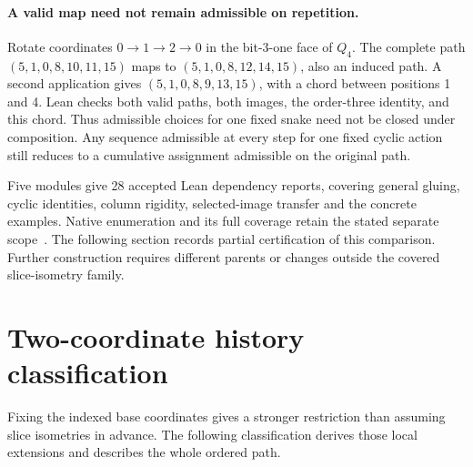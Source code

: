 \documentclass[11pt,a4paper]{article}
\theoremstyle{definition}
\theoremstyle{remark}
\begin{document}
\paragraph{A valid map need not remain admissible on repetition.}
Rotate coordinates $0\to1\to2\to0$ in the bit-3-one face of $Q_4$.
The complete path $(5,1,0,8,10,11,15)$ maps to
$(5,1,0,8,12,14,15)$, also an induced path. A second application gives
$(5,1,0,8,9,13,15)$, with a chord between positions 1 and 4.
Lean checks both valid paths, both images, the order-three identity,
and this chord. Thus admissible choices for one fixed snake need
not be closed under composition. Any sequence admissible at every
step for one fixed cyclic action still reduces to a cumulative
assignment admissible on the original path.

Five modules give 28 accepted Lean dependency reports, covering
general gluing, cyclic identities, column rigidity, selected-image
transfer and the concrete examples. Native enumeration and its full
coverage retain the stated separate scope~\cite{research204}.
The following section records partial certification of this comparison.
Further construction requires different parents or changes outside
the covered slice-isometry family.

\section{Two-coordinate history classification}
\label{sec:history205}

Fixing the indexed base coordinates gives a stronger restriction than
assuming slice isometries in advance. The following classification
derives those local extensions and describes the whole ordered path.
\end{document}
